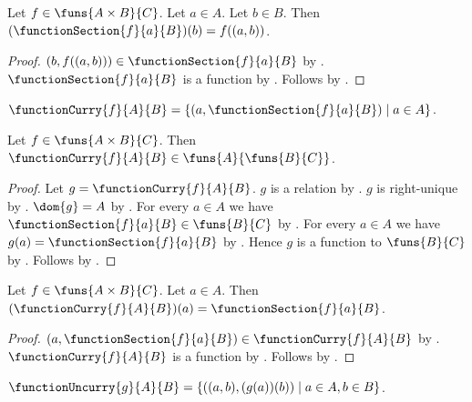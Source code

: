 \begin{proposition}\label{function_section_application}
    Let $f\in\funs{A\times B}{C}$.
    Let $a\in A$.
    Let $b\in B$.
    Then $(\functionSection{f}{a}{B})(b)=f((a,b))$.
\end{proposition}
\begin{proof}
    $(b,f((a,b)))\in\functionSection{f}{a}{B}$
        by .
    $\functionSection{f}{a}{B}$ is a function
        by .
    Follows by .
\end{proof}

\begin{definition}\label{function_curry}
    $\functionCurry{f}{A}{B}
        =\{(a,\functionSection{f}{a}{B})\mid a\in A\}$.
\end{definition}

\begin{proposition}\label{function_curry_type}
    Let $f\in\funs{A\times B}{C}$.
    Then $\functionCurry{f}{A}{B}\in\funs{A}{\funs{B}{C}}$.
\end{proposition}
\begin{proof}
    Let $g=\functionCurry{f}{A}{B}$.
    $g$ is a relation by .
    $g$ is right-unique
        by .
    $\dom{g}=A$ by .
    For every $a\in A$ we have
        $\functionSection{f}{a}{B}\in\funs{B}{C}$
        by .
    For every $a\in A$ we have
        $g(a)=\functionSection{f}{a}{B}$
        by .
    Hence $g$ is a function to $\funs{B}{C}$ by \auto.
    Follows by .
\end{proof}

\begin{proposition}\label{function_curry_application}
    Let $f\in\funs{A\times B}{C}$.
    Let $a\in A$.
    Then $(\functionCurry{f}{A}{B})(a)=\functionSection{f}{a}{B}$.
\end{proposition}
\begin{proof}
    $(a,\functionSection{f}{a}{B})\in\functionCurry{f}{A}{B}$
        by .
    $\functionCurry{f}{A}{B}$ is a function
        by .
    Follows by .
\end{proof}

\begin{definition}\label{function_uncurry}
    $\functionUncurry{g}{A}{B}
        =\{((a,b),(g(a))(b))\mid a\in A,b\in B\}$.
\end{definition}

